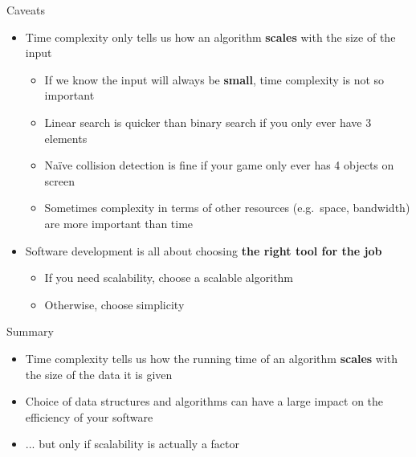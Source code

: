 \begin{frame}{Caveats}
	\begin{itemize}
		\item Time complexity only tells us how an algorithm \textbf{scales} with the size of the input \pause
			\begin{itemize}
				\item If we know the input will always be \textbf{small}, time complexity is not so important \pause
				\item Linear search is quicker than binary search if you only ever have 3 elements \pause
				\item Na\"ive collision detection is fine if your game only ever has 4 objects on screen \pause
				\item Sometimes complexity in terms of other resources (e.g.\ space, bandwidth) are more important than time \pause
			\end{itemize}
		\item Software development is all about choosing \textbf{the right tool for the job} \pause
			\begin{itemize}
				\item If you need scalability, choose a scalable algorithm \pause
				\item Otherwise, choose simplicity
			\end{itemize}
	\end{itemize}
\end{frame}

\begin{frame}{Summary}
	\begin{itemize}
		\item Time complexity tells us how the running time of an algorithm \textbf{scales} with the size of the data
			it is given \pause
		\item Choice of data structures and algorithms can have a large impact on the efficiency of your software \pause
		\item ... but only if scalability is actually a factor
	\end{itemize}
\end{frame}

